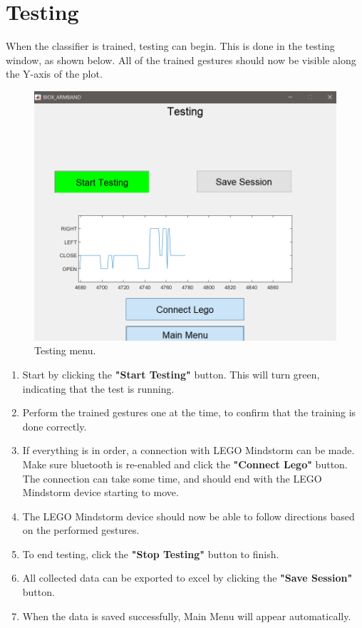 \chapter{Testing}

When the classifier is trained, testing can begin. This is done in the testing window, as shown below. All of the trained gestures should now be visible along the Y-axis of the plot.\\

\begin{figure}[H]
    \centering
    \includegraphics[width=0.6\linewidth]{figures/AppPics/5_TESTING2.PNG}
    \caption{Testing menu.}
    \label{fig:my_label}
\end{figure}

\begin{enumerate}[label=\textbf{Step \arabic*}:]
    \item Start by clicking the \textbf{"Start Testing"} button. This will turn green, indicating that the test is running.
    \item Perform the trained gestures one at the time, to confirm that the training is done correctly.
    \item If everything is in order, a connection with LEGO Mindstorm can be made. Make sure bluetooth is re-enabled and click the \textbf{"Connect Lego"} button. The connection can take some time, and should end with the LEGO Mindstorm device starting to move.
    \item The LEGO Mindstorm device should now be able to follow directions based on the performed gestures.
    \item To end testing, click the \textbf{"Stop Testing"} button to finish.
    \item All collected data can be exported to excel by clicking the \textbf{"Save Session"} button.
    \item When the data is saved successfully, Main Menu will appear automatically.
\end{enumerate}
